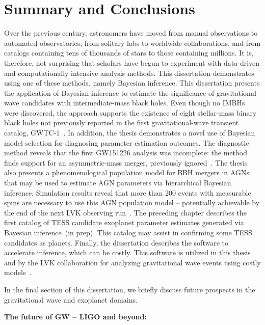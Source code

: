 \chapter{Summary and Conclusions}
\label{cp.conc}

Over the previous century, astronomers have moved from manual observations to automated observatories, from solitary labs to worldwide collaborations, and from catalogs containing tens of thousands of stars to those containing millions. 
It is, therefore, not surprising that scholars have begun to experiment with data-driven and computationally intensive analysis methods. 
This dissertation demonstrates using one of these methods, namely Bayesian inference. 
This dissertation presents the application of Bayesian inference to estimate the significance of gravitational-wave candidates with intermediate-mass black holes. 
Even though no IMBHs were discovered, the approach supports the existence of eight stellar-mass binary black holes not previously reported in the first gravitational-wave transient catalog, GWTC-1~\cite{bcr_imbh_search}. 
In addition, the thesis demonstrates a novel use of Bayesian model selection for diagnosing parameter estimation outcomes. 
The diagnostic method reveals that the first GW151226 analysis was incomplete: the method finds support for an asymmetric-mass merger, previously ignored~\cite{deep_followup}. 
The thesis also presents a phenomenological population model for BBH mergers in AGNs that may be used to estimate AGN parameters via hierarchical Bayesian inference. 
Simulation results reveal that more than 200 events with measurable spins are necessary to use this AGN population model -- potentially achievable by the end of the next LVK observing run~\cite{bbh_in_agn}. 
The preceding chapter describes the first catalog of TESS candidate exoplanet parameter estimates generated via Bayesian inference~(in prep). 
This catalog may assist in confirming some TESS candidates as planets. 
Finally, the dissertation describes the software to accelerate inference, which can be costly. 
This software is utilized in this thesis and by the LVK collaboration for analyzing gravitational wave events using costly models~\cite{pbilby}.

In the final section of this dissertation, we briefly discuss future prospects in the gravitational wave and exoplanet domains. 

\textbf{The future of GW -- LIGO and beyond:}

